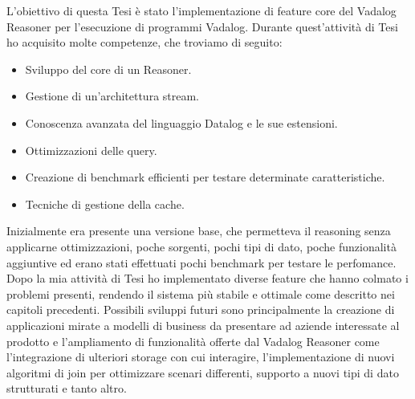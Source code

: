 L'obiettivo di questa Tesi è stato l'implementazione di feature core del Vadalog Reasoner per l'esecuzione di programmi Vadalog. \newline \newline
Durante quest'attività di Tesi ho acquisito molte competenze, che troviamo di seguito:
\begin{itemize}
	\item Sviluppo del core di un Reasoner.
	\item Gestione di un'architettura stream.
	\item Conoscenza avanzata del linguaggio Datalog e le sue estensioni.
	\item Ottimizzazioni delle query.
	\item Creazione di benchmark efficienti per testare determinate caratteristiche.
	\item Tecniche di gestione della cache.
\end{itemize}
Inizialmente era presente una versione base, che permetteva il reasoning senza applicarne ottimizzazioni, poche sorgenti, pochi tipi di dato, poche funzionalità aggiuntive ed erano stati effettuati pochi benchmark per testare le perfomance. \newline
Dopo la mia attività di Tesi ho implementato diverse feature che hanno colmato i problemi presenti, rendendo il sistema più stabile e ottimale come descritto nei capitoli precedenti. \newline \newline
Possibili sviluppi futuri sono principalmente la creazione di applicazioni mirate a modelli di business da presentare ad aziende interessate al prodotto e l'ampliamento di funzionalità offerte dal Vadalog Reasoner come l'integrazione di ulteriori storage con cui interagire, l'implementazione di nuovi algoritmi di join per ottimizzare scenari differenti, supporto a nuovi tipi di dato strutturati e tanto altro.